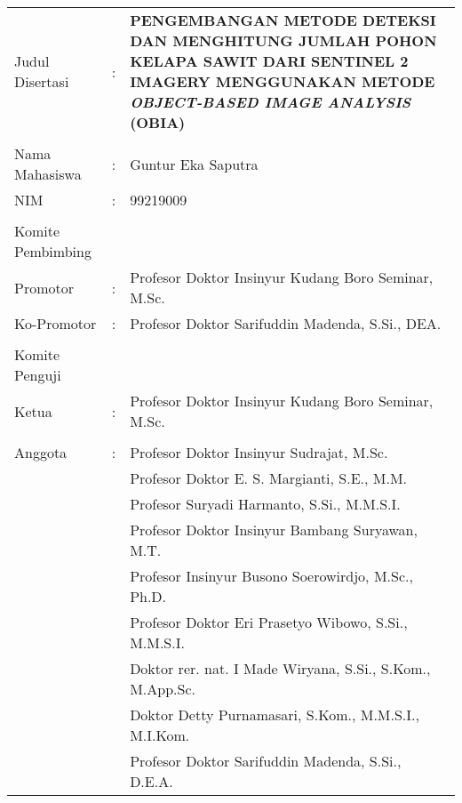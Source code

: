 \newpage
{}

\hspace{-1.4cm}\begin{tabular}{llp{10cm}}
	Judul Disertasi & : & \textbf{PENGEMBANGAN METODE DETEKSI DAN MENGHITUNG JUMLAH POHON KELAPA SAWIT DARI SENTINEL 2 IMAGERY MENGGUNAKAN METODE \textit{OBJECT-BASED IMAGE ANALYSIS} (OBIA)}  \\
	&  & \\
	Nama Mahasiswa & : & Guntur Eka Saputra \\
	NIM  & : & 99219009\\
	&  & \\
	Komite Pembimbing &  & \\
	Promotor & : & Profesor Doktor Insinyur Kudang Boro Seminar, M.Sc.  \\
	Ko-Promotor & : &  Profesor Doktor Sarifuddin Madenda, S.Si., DEA.\\
	&  & \\
	Komite Penguji &  & \\
	Ketua  & : & Profesor Doktor Insinyur Kudang Boro Seminar, M.Sc.  \\ 
	&  & \\
	Anggota& : & Profesor Doktor Insinyur Sudrajat, M.Sc.\\
	&  &Profesor Doktor E. S. Margianti, S.E., M.M.\\
	&  &Profesor Suryadi Harmanto, S.Si., M.M.S.I.\\
	&  &Profesor Doktor Insinyur Bambang Suryawan, M.T.\\
	&  &Profesor Insinyur Busono Soerowirdjo, M.Sc., Ph.D.\\
	&  &Profesor Doktor Eri Prasetyo Wibowo, S.Si., M.M.S.I.\\
	&  &Doktor rer. nat. I Made Wiryana, S.Si., S.Kom., M.App.Sc.\\
	&  &Doktor Detty Purnamasari, S.Kom., M.M.S.I., M.I.Kom.\\
	&  &Profesor Doktor Sarifuddin Madenda, S.Si., D.E.A.\\

\end{tabular}




  












